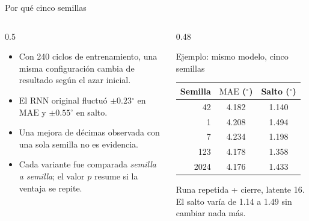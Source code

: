 \documentclass[aspectratio=169,10pt,t]{beamer}
\newcommand{\gr}{$^\circ$}
\newcommand{\mae}{\ensuremath{\mathrm{MAE}}}
\begin{document}
\begin{frame}{Por qué cinco semillas}
\begin{columns}[T]
\begin{column}{0.5\textwidth}
\begin{itemize}\setlength{\itemsep}{4pt}
\item Con 240 ciclos de entrenamiento, una misma configuración cambia de resultado según el azar inicial.
\item El RNN original fluctuó $\pm0.23$\gr{} en \mae{} y $\pm0.55$\gr{} en salto.
\item Una mejora de décimas observada con una sola semilla \alert{no es evidencia}.
\item Cada variante fue comparada \emph{semilla a semilla}; el valor $p$ resume si la ventaja se repite.
\end{itemize}
\end{column}
\begin{column}{0.48\textwidth}
\begin{block}{Ejemplo: mismo modelo, cinco semillas}
\centering\small
\begin{tabular}{rcc}
\toprule
Semilla & \mae{} (\gr) & Salto (\gr)\\
\midrule
42 & 4.182 & 1.140\\
1 & 4.208 & 1.494\\
7 & 4.234 & 1.198\\
123 & 4.178 & 1.358\\
2024 & 4.176 & 1.433\\
\bottomrule
\end{tabular}

\scriptsize Runa repetida + cierre, latente 16. El salto varía de 1.14 a 1.49 sin cambiar nada más.
\end{block}
\end{column}
\end{columns}
\end{frame}
\end{document}
